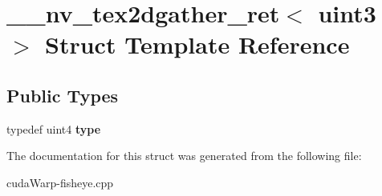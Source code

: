 \hypertarget{struct____nv__tex2dgather__ret_3_01uint3_01_4}{}\section{\+\_\+\+\_\+nv\+\_\+tex2dgather\+\_\+ret$<$ uint3 $>$ Struct Template Reference}
\label{struct____nv__tex2dgather__ret_3_01uint3_01_4}
\subsection*{Public Types}
\begin{DoxyCompactItemize}
\item 
typedef uint4 {\bfseries type}\hypertarget{struct____nv__tex2dgather__ret_3_01uint3_01_4_ad862a61325e0c8f1458aa058e8e1eaa5}{}\label{struct____nv__tex2dgather__ret_3_01uint3_01_4_ad862a61325e0c8f1458aa058e8e1eaa5}

\end{DoxyCompactItemize}


The documentation for this struct was generated from the following file\+:\begin{DoxyCompactItemize}
\item 
cuda\+Warp-\/fisheye.\+cpp\end{DoxyCompactItemize}
